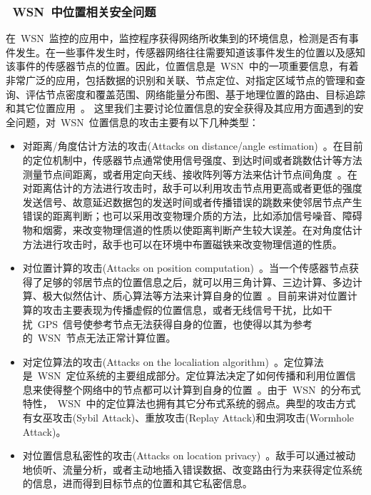 \documentclass[a4paper,10pt]{article}
\begin{document}
\subsubsection{~WSN~中位置相关安全问题}  

在~WSN~监控的应用中，监控程序获得网络所收集到的环境信息，检测是否有事件发生。在一些事件发生时，传感器网络往往需要知道该事件发生的位置以及感知该事件的传感器节点的位置。因此，位置信息是~WSN~中的一项重要信息，有着非常广泛的应用，包括数据的识别和关联、节点定位、对指定区域节点的管理和查询、评估节点密度和覆盖范围、网络能量分布图、基于地理位置的路由、目标追踪和其它位置应用~\cite{Boukerche2007a,Yick2008}。
这里我们主要讨论位置信息的安全获得及其应用方面遇到的安全问题，对~WSN~位置信息的攻击主要有以下几种类型：

\begin{itemize}

\item 对距离/角度估计方法的攻击(Attacks on distance/angle estimation)~\cite{Boukerche2008}。在目前的定位机制中，传感器节点通常使用信号强度、到达时间或者跳数估计等方法测量节点间距离，或者用定向天线、接收阵列等方法来估计节点间角度~\cite{Boukerche2007a}。在对距离估计的方法进行攻击时，敌手可以利用攻击节点用更高或者更低的强度发送信号、故意延迟数据包的发送时间或者传播错误的跳数来使邻居节点产生错误的距离判断；也可以采用改变物理介质的方法，比如添加信号噪音、障碍物和烟雾，来改变物理信道的性质以使距离判断产生较大误差。在对角度估计方法进行攻击时，敌手也可以在环境中布置磁铁来改变物理信道的性质。

\item 对位置计算的攻击(Attacks on position computation)~\cite{Boukerche2008}。当一个传感器节点获得了足够的邻居节点的位置信息之后，就可以用三角计算、三边计算、多边计算、极大似然估计、质心算法等方法来计算自身的位置~\cite{Boukerche2007a}。目前来讲对位置计算的攻击主要表现为传播虚假的位置信息，或者无线信号干扰，比如干扰~GPS~信号使参考节点无法获得自身的位置，也使得以其为参考的~WSN~节点无法正常计算位置。

\item 对定位算法的攻击(Attacks on the localiation algorithm)~\cite{Boukerche2008}。定位算法是~WSN~定位系统的主要组成部分。定位算法决定了如何传播和利用位置信息来使得整个网络中的节点都可以计算到自身的位置~\cite{Boukerche2007a}。由于~WSN~的分布式特性，~WSN~中的定位算法也拥有其它分布式系统的弱点。典型的攻击方式有女巫攻击(Sybil Attack)、重放攻击(Replay Attack)和虫洞攻击(Wormhole Attack)。

\item 对位置信息私密性的攻击(Attacks on location privacy)~\cite{Gruteser2003}。敌手可以通过被动地侦听、流量分析，或者主动地插入错误数据、改变路由行为来获得定位系统的信息，进而得到目标节点的位置和其它私密信息。

\end{itemize}
\end{document}
